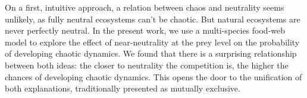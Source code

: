 On a first, intuitive approach, a relation between chaos and neutrality seems unlikely, as fully neutral ecosystems can't be chaotic. But natural ecosystems are never perfectly neutral. In the present work, we use a multi-species food-web model to explore the effect of near-neutrality at the prey level on the probability of developing chaotic dynamics. We found that there is a surprising relationship between both ideas: the closer to neutrality the competition is, the higher the chances of developing chaotic dynamics. This opens the door to the unification of both explanations, traditionally presented as mutually exclusive.
